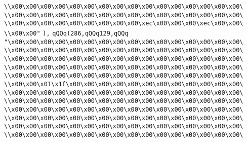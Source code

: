 \verb|\\x00\x00\x00\x00\x00\x00\x00\x00\x00\x00\x00\x00\x00\x00\x00\x00\|\newline
\verb|\\x00\x00\x00\x00\x00\x00\x00\x00\x00\x00\x00\x00\x00\x00\x00\x00\|\newline
\verb|\\x00\x00\x00\x00\x00\x00\x00\x00\x00\xec\x00\x00\x00\xec\x00\x00\|\newline
\verb|\\x00\x00"|\newline
\verb|),|\newline
\verb|qQQq(286,qQQq129,qQQq|\newline
\verb|"\x00\x00\x00\x00\x00\x00\x00\x00\x00\x00\x00\x00\x00\x00\x00\x00\|\newline
\verb|\\x00\x00\x00\x00\x00\x00\x00\x00\x00\x00\x00\x00\x00\x00\x00\x00\|\newline
\verb|\\x00\x00\x00\x00\x00\x00\x00\x00\x00\x00\x00\x00\x00\x00\x00\x00\|\newline
\verb|\\x00\x00\x00\x00\x00\x00\x00\x00\x00\x00\x00\x00\x00\x00\x00\x00\|\newline
\verb|\\x00\x00\x00\x00\x00\x00\x00\x00\x00\x00\x00\x00\x00\x00\x00\x00\|\newline
\verb|\\x00\x00\x01\x1f\x00\x00\x00\x00\x00\x00\x00\x00\x00\x00\x00\x00\|\newline
\verb|\\x00\x00\x00\x00\x00\x00\x00\x00\x00\x00\x00\x00\x00\x00\x00\x00\|\newline
\verb|\\x00\x00\x00\x00\x00\x00\x00\x00\x00\x00\x00\x00\x00\x00\x00\x00\|\newline
\verb|\\x00\x00\x00\x00\x00\x00\x00\x00\x00\x00\x00\x00\x00\x00\x00\x00\|\newline
\verb|\\x00\x00\x00\x00\x00\x00\x00\x00\x00\x00\x00\x00\x00\x00\x00\x00\|\newline
\verb|\\x00\x00\x00\x00\x00\x00\x00\x00\x00\x00\x00\x00\x00\x00\x00\x00\|\newline
\verb|\\x00\x00\x00\x00\x00\x00\x00\x00\x00\x00\x00\x00\x00\x00\x00\x00\|\newline
